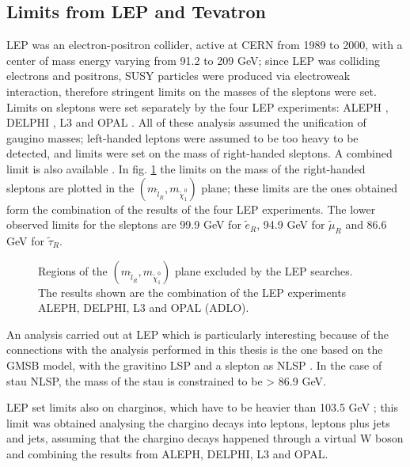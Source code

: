 \subsection{Limits from LEP and Tevatron}
\label{sec:LEPTEVATRONlimits}

LEP was an electron-positron collider, active at CERN from 1989 to 2000, with a center of mass energy varying from 91.2 to 209 GeV; since LEP was colliding electrons and positrons, SUSY particles were produced via electroweak interaction, therefore stringent limits on the masses of the sleptons were set. Limits on sleptons were set separately by the four LEP experiments: ALEPH \cite{aleph:sleptons}, DELPHI \cite{delphi:sleptons}, L3 \cite{L3:sleptons} and OPAL \cite{opal:sleptons}. All of these analysis assumed the unification of gaugino masses; left-handed leptons were assumed to be too heavy to be detected, and limits were set on the mass of right-handed sleptons. A combined limit is also available \cite{LEPWG:sleptons}. In fig. \ref{fig:LEPsleptons} the limits on the mass of the right-handed sleptons are plotted in the $\left( m_{\tilde{l}_R} , m_{\tilde{\chi}_1^0}   \right)$ plane; these limits are the ones obtained form the combination of the results of the four LEP experiments. The lower observed limits for the sleptons are 99.9 GeV for $\tilde{e}_R$, 94.9 GeV for $\tilde{\mu}_R$ and 86.6 GeV for $\tilde{\tau}_R$.

\begin{figure}[h]
\begin{center}
\end{center}
\caption[LEP limits on sleptons masses]{Regions of the $\left( m_{\tilde{l}_R} , m_{\tilde{\chi}_1^0}   \right)$ plane excluded by the LEP searches. The results shown are the combination of the LEP experiments ALEPH, DELPHI, L3 and OPAL (ADLO).}
\label{fig:LEPsleptons}
\end{figure}

An analysis carried out at LEP which is particularly interesting because of the connections with the analysis performed in this thesis is the one based on the GMSB model, with the gravitino LSP and a slepton as NLSP \cite{LEPWG:gmsb}. In the case of stau NLSP, the mass of the stau is constrained to be > 86.9 GeV.

LEP set limits also on charginos, which have to be heavier than 103.5 GeV \cite{LEPWG:chargino}; this limit was obtained analysing the chargino decays into leptons, leptons plus jets and jets, assuming that the chargino decays happened through a virtual W boson and combining the results from ALEPH, DELPHI, L3 and OPAL.


